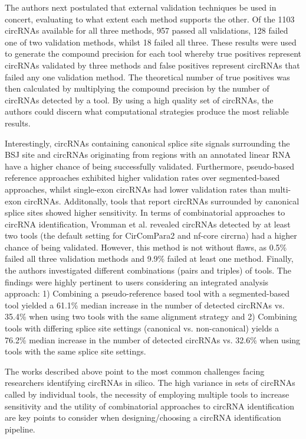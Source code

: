 \documentclass[pdflatex,sn-mathphys-num]{sn-jnl}
\begin{document}
The authors next postulated that external validation techniques be used in concert, evaluating to what extent each method supports the other. Of the 1103 circRNAs available for all three methods, 957 passed all validations, 128 failed one of two validation methods, whilst 18 failed all three. These results were used to generate the compound precision for each tool whereby true positives represent circRNAs validated by three methods and false positives represent circRNAs that failed any one validation method. The theoretical number of true positives was then calculated by multiplying the compound precision by the number of circRNAs detected by a tool. By using a high quality set of circRNAs, the authors could discern what computational strategies produce the most reliable results. \par

Interestingly, circRNAs containing canonical splice site signals surrounding the BSJ site and circRNAs originating from regions with an annotated linear RNA have a higher chance of being successfully validated. Furthermore, pseudo-based reference approaches exhibited higher validation rates over segmented-based approaches, whilst single-exon circRNAs had lower validation rates than multi-exon circRNAs. Additonally, tools that report circRNAs surrounded by canonical splice sites showed higher sensitivity.
In terms of combinatorial approaches to circRNA identification, Vromman et al. revealed circRNAs detected by at least two tools (the default setting for CirComPara2 and nf-core circrna) had a higher chance of being validated. However, this method is not without flaws, as 0.5\% failed all three validation methods and 9.9\% failed at least one method. Finally, the authors investigated different combinations (pairs and triples) of tools. The findings were highly pertinent to users considering an integrated analysis approach: 1) Combining a pseudo-reference based tool with a segmented-based tool yielded a 61.1\% median increase in the number of detected circRNAs vs. 35.4\% when using two tools with the same alignment strategy and 2) Combining tools with differing splice site settings (canonical vs. non-canonical) yields a 76.2\% median increase in the number of detected circRNAs vs. 32.6\% when using tools with the same splice site settings. \par

The works described above point to the most common challenges facing researchers identifying circRNAs in silico. The high variance in sets of circRNAs called by individual tools, the necessity of employing multiple tools to increase sensitivity and the utility of combinatorial approaches to circRNA identification are key points to consider when designing/choosing a circRNA identification pipeline.
\end{document}
